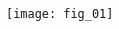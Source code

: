 \begin{multicols}{2}
\end{multicols}


\begin{center}
\texttt{[image: fig\_01]}
\end{center}
%
%
%
%